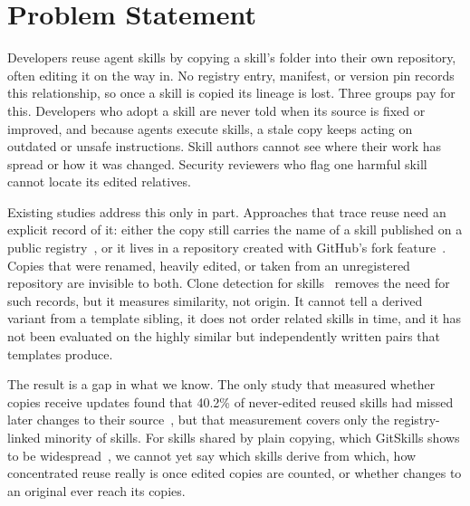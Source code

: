 \section{Problem Statement}
\label{sec:problem}

Developers reuse agent skills by copying a skill's folder into their own repository, often
editing it on the way in. No registry entry, manifest, or version pin records this
relationship, so once a skill is copied its lineage is lost. Three groups pay for this.
Developers who adopt a skill are never told when its source is fixed or improved, and because
agents execute skills, a stale copy keeps acting on outdated or unsafe instructions. Skill
authors cannot see where their work has spread or how it was changed. Security reviewers who
flag one harmful skill cannot locate its edited relatives.

Existing studies address this only in part. Approaches that trace reuse need an explicit
record of it: either the copy still carries the name of a skill published on a public
registry~\cite{gao2026registry}, or it lives in a repository created with GitHub's fork
feature~\cite{wu2026adaptation}. Copies that were renamed, heavily edited, or taken from an
unregistered repository are invisible to both. Clone detection for
skills~\cite{zhu2026skillreuse} removes the need for such records, but it measures
similarity, not origin. It cannot tell a derived variant from a template sibling, it does not
order related skills in time, and it has not been evaluated on the highly similar but
independently written pairs that templates produce.

The result is a gap in what we know. The only study that measured whether copies receive
updates found that 40.2\% of never-edited reused skills had missed later changes to their
source~\cite{gao2026registry}, but that measurement covers only the registry-linked minority
of skills. For skills shared by plain copying, which GitSkills shows to be
widespread~\cite{destefanis2027gitskills}, we cannot yet say which skills derive from which,
how concentrated reuse really is once edited copies are counted, or whether changes to an
original ever reach its copies.
